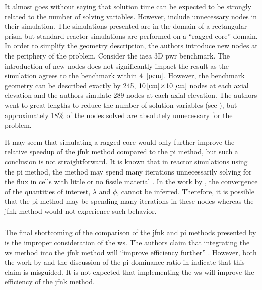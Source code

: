       It almost goes without saying that solution time can be expected to be
      strongly related to the number of solving variables. However,
      \citeauthor{qe2paper} include unnecessary nodes in their simulation. The
      simulations presented are in the domain of a rectangular prism but
      standard reactor simulations are performed on a ``ragged core'' domain. In
      order to simplify the geometry description, the authors introduce new
      nodes at the periphery of the problem. Consider the \gls{iaea} 3D
      \gls{pwr} benchmark. The introduction of new nodes does not significantly
      impact the result as the simulation agrees to the benchmark within
      $4~\left[\text{{pcm}}\right]$. However, the benchmark geometry can be described exactly
      by 245, $10\left[\text{{cm}}\right] \! \times \! 10\left[\text{{cm}}\right]$ nodes at each axial
      elevation and the authors simulate 289 nodes at each axial elevation. The
      authors went to great lengths to reduce the number of solution variables
      (see ), but approximately 18\% of the nodes
      solved are absolutely unnecessary for the problem.

      It may seem that simulating a ragged core would only further improve the
      relative speedup of the \gls{jfnk} method compared to the \gls{pi} method,
      but such a conclusion is not straightforward. It is known that in reactor
      simulations using the \gls{pi} method, the method may spend many
      iterations unnecessarily solving for the flux in cells with little or no
      fissile material \cite{gehinThesis}. In the work by \citeauthor{qe2paper},
      the convergence of the quantities of interest, $\lambda$ and
      $\overline{\phi}$, cannot be inferred. Therefore, it is possible that the
      \gls{pi} method may be spending many iterations in these nodes whereas the
      \gls{jfnk} method would not experience such behavior.

    \subsubsection{}
    \label{sec:wielandt_shift}

      The final shortcoming of the comparison of the \gls{jfnk} and \gls{pi}
      methods presented by \citeauthor{qe2paper} is the improper consideration
      of the \gls{ws}. The authors claim that integrating the \gls{ws} method
      into the \gls{jfnk} method will ``improve efficiency further''
      \cite{qe2paper}. However, both the work by \citeauthor{gill_azmy} and the
      discussion of the \gls{pi} dominance ratio in 
      indicate that this claim is misguided. It is not expected that
      implementing the \gls{ws} will improve the efficiency of the \gls{jfnk}
      method.

